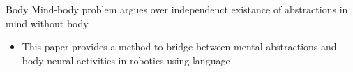 \begin{frame}{Body}
    Mind-body problem argues over independenct existance of abstractions in mind without body \cite{georgiev-2020-quantum-information-theoretic-approach-to-the-mind-brain-problem}
    
    \begin{itemize}
        \item This paper provides a method to bridge between mental abstractions and body neural activities in robotics using language
    \end{itemize}
\end{frame}